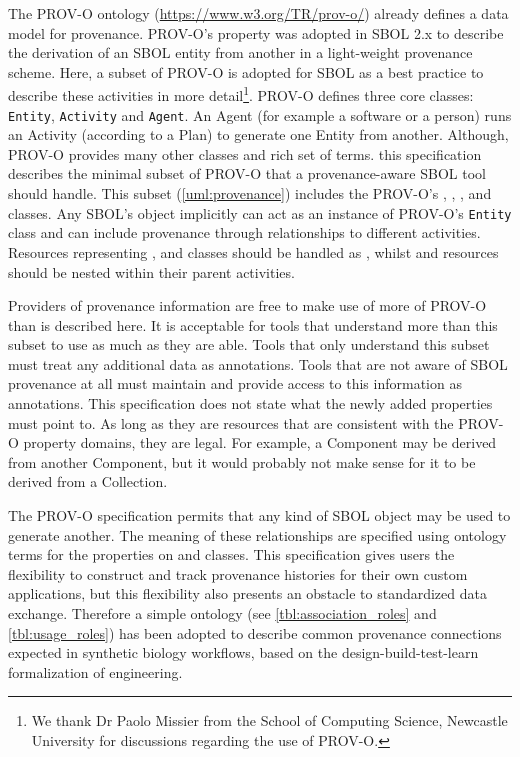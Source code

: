 The PROV-O ontology (\url{https://www.w3.org/TR/prov-o/}) already defines a data model for provenance. PROV-O's  property was adopted in SBOL 2.x to describe the derivation of an SBOL entity from another in a light-weight provenance scheme.  Here, a subset of PROV-O is adopted for SBOL as a best practice to describe these activities in more detail\footnote{We thank Dr Paolo Missier from the School of Computing Science, Newcastle University for discussions regarding the use of PROV-O.}. PROV-O defines three core classes: \texttt{Entity}, \texttt{Activity} and \texttt{Agent}. An Agent (for example a software or a person) runs an Activity (according to a Plan) to generate one Entity from another. Although, PROV-O provides many other classes and rich set of terms. this specification describes the minimal subset of PROV-O that a provenance-aware SBOL tool should handle. This subset (\ref{uml:provenance}) includes the PROV-O's , , ,  and  classes. Any SBOL's  object implicitly can act as an instance of PROV-O's \texttt{Entity} class and can include provenance through relationships to different activities. Resources representing ,  and  classes should be handled as , whilst  and  resources should be nested within their parent activities. 


Providers of provenance information are free to make use of more of PROV-O than is described here. It is acceptable for tools that understand more than this subset to use as much as they are able. Tools that only understand this subset must treat any additional data as annotations. Tools that are not aware of SBOL provenance at all must maintain and provide access to this information as annotations. This specification does not state what the newly added properties must point to. As long as they are resources that are consistent with the PROV-O property domains, they are legal. For example, a Component may be derived from another Component, but it would probably not make sense for it to be derived from a Collection.

The PROV-O specification permits that any kind of SBOL object may be used to generate another. The meaning of these relationships are specified using ontology terms for the  properties on  and  classes.  This specification gives users the flexibility to construct and track provenance histories for their own custom applications, but this flexibility also presents an obstacle to standardized data exchange. Therefore a simple ontology (see \ref{tbl:association_roles} and \ref{tbl:usage_roles}) has been adopted to describe common provenance connections expected in synthetic biology workflows, based on the design-build-test-learn formalization of engineering.

